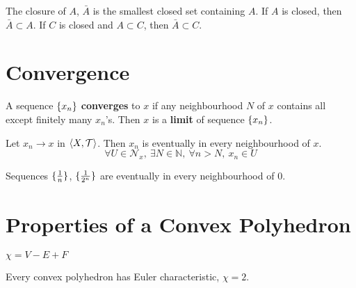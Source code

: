 \begin{note}
	The closure of $A$, $\bar{A}$ is the smallest closed set containing $A$.
	If $A$ is closed, then $\bar{A} \subset A$.
	If $C$ is closed and $A \subset C$, then $\bar{A} \subset C$.
\end{note}

\section{Convergence}
\begin{definition}[neighbourhood]
	A sequence $\{x_n\}$ \textbf{converges} to $x$ if any neighbourhood $N$ of $x$ contains all except finitely many $x_n$'s.
	Then $x$ is a \textbf{limit} of sequence $\{x_n\}$.
\end{definition}
\begin{note}
	Let $x_n \to x$ in $\left\langle X,\mathcal{T} \right\rangle$.
	Then $x_n$ is eventually in every neighbourhood of $x$.
	\begin{equation}
		\forall U \in \mathcal{N}_x,\ \exists N \in \mathbb{N},\ \forall n > N,\ x_n \in U
	\end{equation}
\end{note}

\begin{note}
	Sequences $\{\frac{1}{n}\}$, $\{\frac{1}{2^n}\}$ are eventually in every neighbourhood of $0$.
\end{note}


\section{Properties of a Convex Polyhedron}
\begin{definition}
	$\chi = V - E + F$
\end{definition}
\begin{remark}
	Every convex polyhedron has Euler characteristic, $\chi = 2$.
\end{remark}
